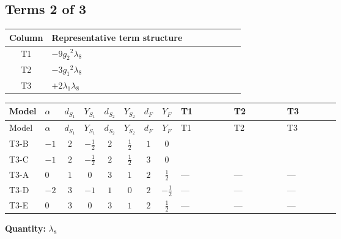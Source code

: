 \documentclass[8pt]{article}
\begin{document}
\begin{landscape}
\subsection*{Terms 2 of 3}
\begin{center}
\begin{tabular}{@{}c >{\raggedright\arraybackslash}p{0.82\linewidth}@{}}
\toprule
Column & Representative term structure \\
\midrule
T1 & \(\displaystyle -9 {g_2}^2 {\lambda_8}\) \\
\midrule
T2 & \(\displaystyle -3 {g_1}^2 {\lambda_8}\) \\
\midrule
T3 & \(\displaystyle +2 {\lambda_1} {\lambda_8}\) \\
\midrule
\bottomrule
\end{tabular}
\end{center}
\smallskip
\tiny
\begin{longtable}{@{}llcccccc >{\raggedright\arraybackslash}p{0.21\linewidth} >{\raggedright\arraybackslash}p{0.21\linewidth} >{\raggedright\arraybackslash}p{0.21\linewidth}@{}}
\toprule
Model & $\alpha$ & $d_{S_1}$ & $Y_{S_1}$ & $d_{S_2}$ & $Y_{S_2}$ & $d_F$ & $Y_F$ & T1 & T2 & T3 \\
\midrule
\endfirsthead
\toprule
Model & $\alpha$ & $d_{S_1}$ & $Y_{S_1}$ & $d_{S_2}$ & $Y_{S_2}$ & $d_F$ & $Y_F$ & T1 & T2 & T3 \\
\midrule
\endhead
T3-B & $-1$ & $2$ & $-\frac{1}{2}$ & $2$ & $\frac{1}{2}$ & $1$ & $0$ & \scriptsize\adjustbox{max width=\linewidth}{$\begin{gathered} -9 {g_2}^2 {\lambda_8}\end{gathered}$} & \scriptsize\adjustbox{max width=\linewidth}{$\begin{gathered} -3 {g_1}^2 {\lambda_8}\end{gathered}$} & \scriptsize\adjustbox{max width=\linewidth}{$\begin{gathered} +2 {\lambda_1} {\lambda_8}\end{gathered}$} \\
\midrule
T3-C & $-1$ & $2$ & $-\frac{1}{2}$ & $2$ & $\frac{1}{2}$ & $3$ & $0$ & \scriptsize\adjustbox{max width=\linewidth}{$\begin{gathered} -9 {g_2}^2 {\lambda_8}\end{gathered}$} & \scriptsize\adjustbox{max width=\linewidth}{$\begin{gathered} -3 {g_1}^2 {\lambda_8}\end{gathered}$} & \scriptsize\adjustbox{max width=\linewidth}{$\begin{gathered} +2 {\lambda_1} {\lambda_8}\end{gathered}$} \\
\midrule
T3-A & $0$ & $1$ & $0$ & $3$ & $1$ & $2$ & $\frac{1}{2}$ & --- & --- & --- \\
\midrule
T3-D & $-2$ & $3$ & $-1$ & $1$ & $0$ & $2$ & $-\frac{1}{2}$ & --- & --- & --- \\
\midrule
T3-E & $0$ & $3$ & $0$ & $3$ & $1$ & $2$ & $\frac{1}{2}$ & --- & --- & --- \\
\midrule
\bottomrule
\end{longtable}
\clearpage
\noindent\textbf{Quantity: }$\lambda_{8}$\par\smallskip

\end{landscape}
\end{document}
